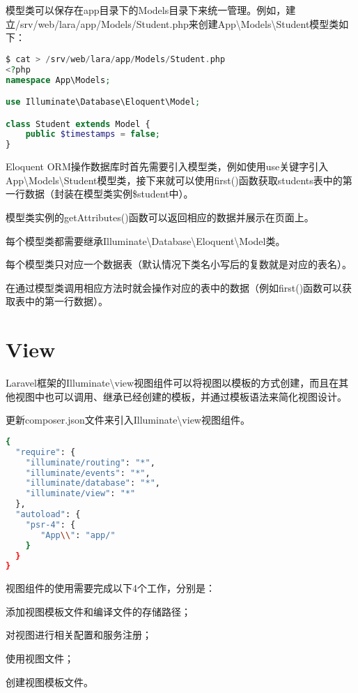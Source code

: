 模型类可以保存在app目录下的Models目录下来统一管理。例如，建立/srv/web/lara/app/Models/Student.php来创建App\textbackslash Models\textbackslash Student模型类如下：

\begin{lstlisting}[language=PHP]
$ cat > /srv/web/lara/app/Models/Student.php
<?php
namespace App\Models;

use Illuminate\Database\Eloquent\Model;

class Student extends Model {
    public $timestamps = false;
}
\end{lstlisting}


Eloquent ORM操作数据库时首先需要引入模型类，例如使用use关键字引入App\textbackslash Models\textbackslash Student模型类，接下来就可以使用first()函数获取students表中的第一行数据（封装在模型类实例\$student中）。

模型类实例的getAttributes()函数可以返回相应的数据并展示在页面上。

\begin{compactitem}
\item 每个模型类都需要继承Illuminate\textbackslash Database\textbackslash Eloquent\textbackslash Model类。
\item 每个模型类只对应一个数据表（默认情况下类名小写后的复数就是对应的表名）。
\end{compactitem}


在通过模型类调用相应方法时就会操作对应的表中的数据（例如first()函数可以获取表中的第一行数据）。


\section{View}

Laravel框架的Illuminate\textbackslash view视图组件可以将视图以模板的方式创建，而且在其他视图中也可以调用、继承已经创建的模板，并通过模板语法来简化视图设计。

更新composer.json文件来引入Illuminate\textbackslash view视图组件。

\begin{lstlisting}[language=bash]
{
  "require": {
    "illuminate/routing": "*",
    "illuminate/events": "*",
    "illuminate/database": "*",
    "illuminate/view": "*"
  },
  "autoload": {
    "psr-4": {
       "App\\": "app/"
    }
  }
}
\end{lstlisting}


视图组件的使用需要完成以下4个工作，分别是：

\begin{compactenum}
\item 添加视图模板文件和编译文件的存储路径；
\item 对视图进行相关配置和服务注册；
\item 使用视图文件；
\item 创建视图模板文件。
\end{compactenum}



